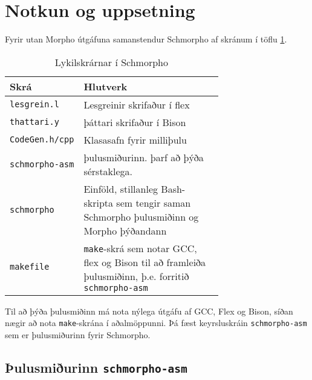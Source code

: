 \documentclass[a4paper,icelandic]{article}
\begin{document}
\section{Notkun og uppsetning}
Fyrir utan Morpho útgáfuna \cite{morphodist} samanstendur
  Schmorpho af skránum í töflu \ref{tab:skrar}.
\begin{table}[h!]
  \centering
  \begin{tabular}{lp{0.7\linewidth}}
    \hline 
    \textbf{Skrá}        & \textbf{Hlutverk}\\\hline\hline 
    \verb|lesgrein.l|    & Lesgreinir skrifaður í flex\cite{flex}    \\\hline 
    \verb|thattari.y|    & þáttari skrifaður í Bison \cite{bison}    \\\hline 
    \verb|CodeGen.h/cpp| & Klasasafn fyrir milliþulu\\\hline 
    \verb|schmorpho-asm| & þulusmiðurinn. þarf að þýða sérstaklega.  \\\hline 
    \verb|schmorpho|     & Einföld, stillanleg Bash-skripta sem tengir saman
                           Schmorpho þulusmiðinn og Morpho þýðandann \\\hline 
    \verb|makefile|      & \verb|make|-skrá sem notar GCC, flex og Bison
                           \cite{gcc,flex,bison} til að framleiða þulusmiðinn,
                           þ.e. forritið \verb|schmorpho-asm|        \\\hline
  \end{tabular}
  \caption{Lykilskrárnar í Schmorpho}
  \label{tab:skrar}
\end{table}
Til að þýða þulusmiðinn má nota nýlega útgáfu af GCC, Flex og Bison,
síðan nægir að nota \verb|make|-skrána í aðalmöppunni. Þá fæst
keyrsluskráin \verb|schmorpho-asm| sem er þulusmiðurinn fyrir
Schmorpho.  

\subsection{Þulusmiðurinn \texttt{schmorpho-asm}}
\label{sec:notkun-pulusmidarins}
\end{document}
